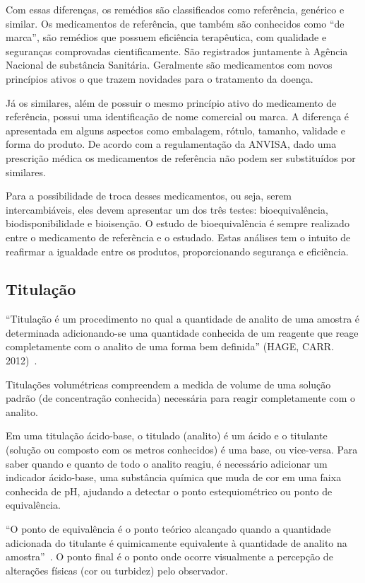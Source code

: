 Com essas diferenças, os remédios são classificados como referência, genérico e similar. Os
medicamentos de referência, que também são conhecidos como “de marca”, são remédios que possuem
eficiência terapêutica, com qualidade e seguranças comprovadas cientificamente. São registrados
juntamente à Agência Nacional de substância Sanitária. Geralmente são medicamentos com novos
princípios ativos o que trazem novidades para o tratamento da doença.

Já os similares, além de possuir o mesmo princípio ativo do medicamento de referência, possui uma
identificação de nome comercial ou marca. A diferença é apresentada em alguns aspectos como
embalagem, rótulo, tamanho, validade e forma do produto. De acordo com a regulamentação da ANVISA,
dado uma prescrição médica os medicamentos de referência não podem ser substituídos por similares.

Para a possibilidade de troca desses medicamentos, ou seja, serem intercambiáveis, eles devem
apresentar um dos três testes: bioequivalência, biodisponibilidade e bioisenção. O estudo de
bioequivalência é sempre realizado entre o medicamento de referência e o estudado. Estas análises
tem o intuito de reafirmar a igualdade entre os produtos, proporcionando segurança e
eficiência.~\cite{ache2015}

\subsection{Titulação}\label{titulacao}

``Titulação é um procedimento no qual a quantidade de analito de uma amostra é determinada
adicionando-se uma quantidade conhecida de um reagente que reage completamente com o analito de uma
forma bem definida'' (HAGE, CARR. 2012)~\cite{Hage2012}.

Titulações volumétricas compreendem a medida de volume de uma solução padrão (de concentração
conhecida) necessária para reagir completamente com o analito.~\cite{Skoog2014}

Em uma titulação ácido-base, o titulado (analito) é um ácido e o titulante (solução ou composto com
os metros conhecidos) é uma base, ou vice-versa. Para saber quando e quanto de todo o analito
reagiu, é necessário adicionar um indicador ácido-base, uma substância química que muda de cor em
uma faixa conhecida de pH, ajudando a detectar o ponto estequiométrico ou ponto de equivalência.

``O ponto de equivalência é o ponto teórico alcançado quando a quantidade adicionada do titulante é
quimicamente equivalente à quantidade de analito na amostra''~\cite{Skoog2014}. O ponto final é o
ponto onde ocorre visualmente a percepção de alterações físicas (cor ou turbidez) pelo observador.

